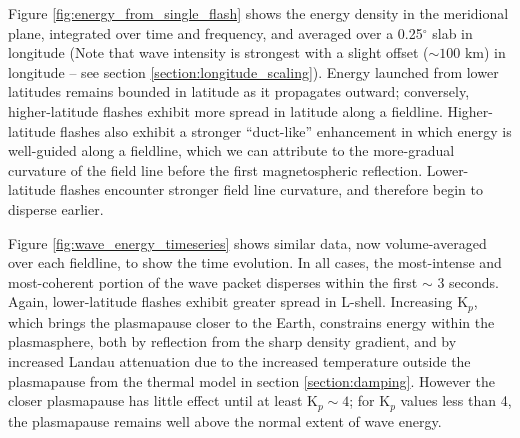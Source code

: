 Figure \ref{fig:energy_from_single_flash} shows the energy density in the meridional plane, integrated over time and frequency, and averaged over a 0.25$^\circ$ slab in longitude (Note that wave intensity is strongest with a slight offset ($\sim 100$ km) in longitude -- see section \ref{section:longitude_scaling}). Energy launched from lower latitudes remains bounded in latitude as it propagates outward; conversely, higher-latitude flashes exhibit more spread in latitude along a fieldline. Higher-latitude flashes also exhibit a stronger ``duct-like'' enhancement in which energy is well-guided along a fieldline, which we can attribute to the more-gradual curvature of the field line before the first magnetospheric reflection. Lower-latitude flashes encounter stronger field line curvature, and therefore begin to disperse earlier. 

Figure \ref{fig:wave_energy_timeseries} shows similar data, now volume-averaged over each fieldline, to show the time evolution. In all cases, the most-intense and most-coherent portion of the wave packet disperses within the first $\sim$ 3 seconds. Again, lower-latitude flashes exhibit greater spread in L-shell. Increasing K$_p$, which brings the plasmapause closer to the Earth, constrains energy within the plasmasphere, both by reflection from the sharp density gradient, and by increased Landau attenuation due to the increased temperature outside the plasmapause from the thermal model in section \ref{section:damping}. However the closer plasmapause has little effect until at least K$_p \sim 4$; for K$_p$ values less than 4, the plasmapause remains well above the normal extent of wave energy. 

